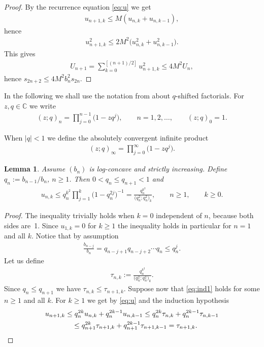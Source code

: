 \documentclass[pdftex]{sigma}
\numberwithin{equation}{section}
\newtheorem{lem}[thm]{Lemma}
\begin{document}
\begin{proof} By the recurrence equation \eqref{eq:u} we get
\begin{gather*}
u_{n+1,k}\le M(u_{n,k}+u_{n,k-1}),
\end{gather*}
hence
\begin{gather*}
u_{n+1,k}^2\le 2M^2\big(u_{n,k}^2+u_{n,k-1}^2\big).
\end{gather*}
This gives
\begin{gather*}
U_{n+1}=\sum_{k=0}^{[(n+1)/2]} u_{n+1,k}^2\le 4M^2 U_n,
\end{gather*}
hence $s_{2n+2}\le 4M^2b_n^2s_{2n}$.
\end{proof}

In the following we shall use the notation from \cite{G:R} about $q$-shifted factorials. For $z,q\in\mathbb C$ we write
\begin{gather}\label{eq:qshift}
(z;q)_n=\prod_{j=0}^{n-1}\big(1-zq^{j}\big),\qquad n=1,2,\ldots,\qquad (z;q)_0=1.
\end{gather}

When $|q|<1$ we define the absolutely convergent infinite product
\begin{gather}\label{eq:q-infty}
(z;q)_{\infty}=\prod_{j=0}^\infty\big(1-zq^j\big).
\end{gather}

\begin{lem}\label{thm:logconcave} Assume $(b_n)$ is log-concave and strictly increasing. Define $q_n:=b_{n-1}/b_n$, $n\ge 1$. Then $0<q_n\le q_{n+1}<1$ and
\begin{gather}\label{eq:ind1}
u_{n,k}\le q_n^{k^2}\prod_{j=1}^k \big(1-q_n^{2j}\big)^{-1}= \frac{q_n^{k^2}}{\big(q_n^2;q_n^2\big)_k},\qquad n\ge 1, \qquad k\ge 0.
\end{gather}
\end{lem}

\begin{proof} The inequality trivially holds when $k=0$ independent of $n$, because both sides are~1. Since $u_{1,k}=0$ for $k\ge 1$ the inequality holds in particular for $n=1$ and all $k$.
Notice that by assumption
\begin{gather*}
\frac{b_{n-j}}{b_n}=q_{n-j+1}q_{n-j+2}\cdots q_n\le q_n^j.
\end{gather*}
Let us define
\begin{gather*}
\tau_{n,k}:=\frac{q_n^{k^2}}{\big(q_n^2;q_n^2\big)_k}.
\end{gather*}
Since $q_n\le q_{n+1}$ we have $\tau_{n,k}\le \tau_{n+1,k}$. Suppose now that \eqref{eq:ind1} holds for some $n\ge 1$ and all $k$. For $k\ge 1$ we get by \eqref{eq:u} and the induction hypothesis
\begin{gather*}
 u_{n+1,k} \le q_{n}^{2k}u_{n,k}+ q_{n}^{2k-1}u_{n,k-1} \le q_{n}^{2k}\tau_{n,k}+ q_{n}^{2k-1}\tau_{n,k-1}\\
\hphantom{u_{n+1,k}}{} \le q_{n+1}^{2k}\tau_{n+1,k}+q_{n+1}^{2k-1}\tau_{n+1,k-1}=\tau_{n+1,k}.\tag*{\qed}
\end{gather*}\renewcommand{\qed}{}
\end{proof}
\end{document}
